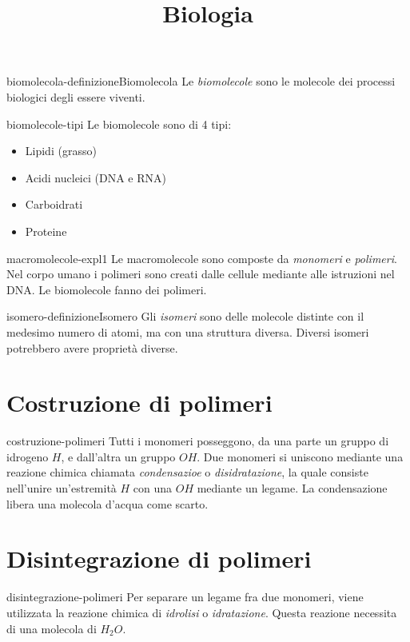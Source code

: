 \documentclass[preview]{standalone}
\begin{document}
\title{Biologia}
\genpage

\begin{snippetdefinition}{biomolecola-definizione}{Biomolecola}
    Le \textit{biomolecole} sono le molecole dei processi biologici degli essere viventi.
\end{snippetdefinition}


\begin{snippet}{biomolecole-tipi}
    Le biomolecole sono di 4 tipi:
    \begin{itemize}
        \item Lipidi (grasso)
        \item Acidi nucleici (DNA e RNA)
        \item Carboidrati
        \item Proteine
    \end{itemize}
\end{snippet}

\begin{snippet}{macromolecole-expl1}
    Le macromolecole sono composte da \textit{monomeri} e \textit{polimeri}.
Nel corpo umano i polimeri sono creati dalle cellule mediante alle istruzioni nel DNA.
Le biomolecole fanno dei polimeri.
\end{snippet}

\begin{snippetdefinition}{isomero-definizione}{Isomero}
    Gli \textit{isomeri} sono delle molecole distinte con il medesimo numero di atomi,
    ma con una struttura diversa. Diversi isomeri potrebbero avere proprietà diverse.
\end{snippetdefinition}

\section{Costruzione di polimeri}

\begin{snippet}{costruzione-polimeri}
    Tutti i monomeri posseggono, da una parte un gruppo di idrogeno \(H\),
e dall'altra un gruppo \(OH\).
Due monomeri si uniscono mediante una reazione chimica chiamata \textit{condensazioe} o \textit{disidratazione}, la quale consiste
nell'unire un'estremità \(H\) con una \(OH\) mediante un legame.
La condensazione libera una molecola d'acqua come scarto.
\end{snippet}

\section{Disintegrazione di polimeri}

\begin{snippet}{disintegrazione-polimeri}
    Per separare un legame fra due monomeri, viene utilizzata la reazione chimica di \textit{idrolisi} o \textit{idratazione}.
    Questa reazione necessita di una molecola di \(H_2O\).
\end{snippet}
\end{document}
